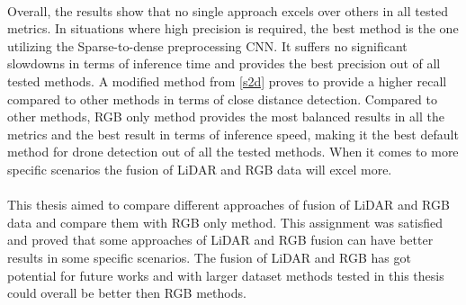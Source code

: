 \documentclass[twoside]{ctuthesis}
\theoremstyle{plain}
\theoremstyle{definition}
\theoremstyle{note}
\begin{document}
\\
Overall, the results show that no single approach excels over others in all tested metrics. In situations where high precision is required, the best method is the one utilizing the Sparse-to-dense preprocessing CNN. It suffers no significant slowdowns in terms of inference time and provides the best precision out of all tested methods. A modified method from \autoref{s2d} proves to provide a higher recall compared to other methods in terms of close distance detection. Compared to other methods, RGB only method provides the most balanced results in all the metrics and the best result in terms of inference speed, making it the best default method for drone detection out of all the tested methods. When it comes to more specific scenarios the fusion of LiDAR and RGB data will excel more.\\
\\
This thesis aimed to compare different approaches of fusion of LiDAR and RGB data and compare them with RGB only method. This assignment was satisfied and proved that some approaches of LiDAR and RGB fusion can have better results in some specific scenarios. The fusion of LiDAR and RGB has got potential for future works and with larger dataset methods tested in this thesis could overall be better then RGB methods.


\end{document}
